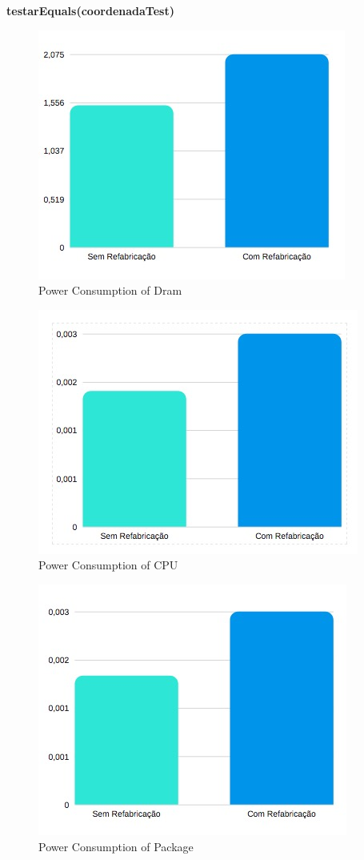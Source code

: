 \textbf{testarEquals(coordenadaTest)}

\begin{figure}[H]
    \centering
    \includegraphics[scale=0.8]{tex/img/graficos/24.jpg}
    \caption{Power Consumption of Dram}
\end{figure}

\begin{figure}[H]
    \centering
    \includegraphics[scale=0.8]{tex/img/graficos/25.jpg}
    \caption{Power Consumption of CPU}
\end{figure}

\begin{figure}[H]
    \centering
    \includegraphics[scale=0.8]{tex/img/graficos/26.jpg}
    \caption{Power Consumption of Package}
\end{figure}

